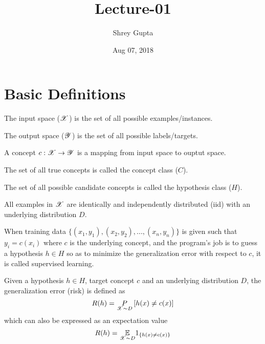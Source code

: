 \documentclass[a4paper,english,12pt]{article}
\title{Lecture-01}
\date{Aug 07, 2018}
\author{Shrey Gupta}
\begin{document}
\maketitle

\section{Basic Definitions}

\begin{defn}
The input space ($\mathscr{X}$) is the set of all possible examples/instances.
\end{defn}

\begin{defn}
The output space ($\mathscr{Y}$) is the set of all possible labels/targets.
\end{defn}

\begin{defn}
A concept $c:\mathscr{X} \rightarrow \mathscr{Y}$ is a mapping from input space to ouptut space.
\end{defn}

\begin{defn}
The set of all true concepts is called the concept class ($C$).
\end{defn}

\begin{defn}
The set of all possible candidate concepts is called the hypothesis class ($H$).
\end{defn}

\begin{assum}
All examples in $\mathscr{X}$ are identically and independently distributed (iid) with an underlying distribution $D$.
\end{assum}

\begin{defn}
When training data $\{ (x_1, y_1), (x_2, y_2), ... , (x_n, y_n) \}$ is given such that $y_i = c(x_i)$ where $c$ is the underlying concept, and the program's job is to guess a hypothesis $h \in H$ so as to minimize the generalization error with respect to $c$, it is called supervised learning.
\end{defn}

\begin{defn}
Given a hypothesis $h\in H$, target concept $c$ and an underlying distribution $D$, the generalization error (risk) is defined as
$$ R(h) = \underset{\mathscr{X} \sim D} P \left[ h(x) \neq c(x) \right] $$
which can also be expressed as an expectation value
$$ R(h) = \underset{\mathscr{X} \sim D}{\mathbb{E}} 1_{ \left\{ h(x) \neq c(x) \right\}} $$
\end{defn}
\end{document}
